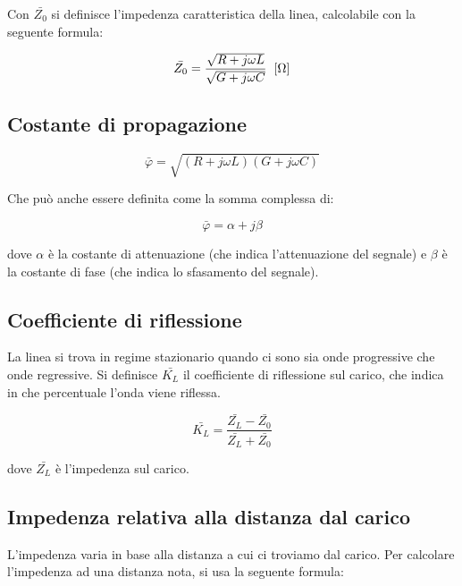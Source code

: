 \documentclass{article}
\begin{document}
    Con $\bar{Z_0}$ si definisce l'impedenza caratteristica della linea, calcolabile con la seguente formula:

    \begin{equation}
        \bar{Z_0} = \frac{\sqrt{R + j \omega L}}{\sqrt{G + j \omega C}} \hspace{0.2cm} [\Omega]
    \end{equation}

    \subsection{Costante di propagazione}

    \begin{equation}
        \bar{\varphi} = \sqrt{(R + j \omega L)(G + j \omega C)}
    \end{equation}

    Che può anche essere definita come la somma complessa di:

    \begin{equation}
        \bar{\varphi} = \alpha + j \beta
    \end{equation}

    dove $\alpha$ è la costante di attenuazione (che indica l'attenuazione del segnale) e $\beta$ è la 
    costante di fase (che indica lo sfasamento del segnale).

    \subsection{Coefficiente di riflessione}

    La linea si trova in regime stazionario quando ci sono sia onde progressive che onde regressive.
    Si definisce $\bar{K_L}$ il coefficiente di riflessione sul carico, che indica in che percentuale l'onda viene
    riflessa.

    \begin{equation}
        \bar{K_L} = \frac{
            \bar{Z_L} - \bar{Z_0}
        }{
            \bar{Z_L} + \bar{Z_0}
        }
    \end{equation}

    dove $\bar{Z_L}$ è l'impedenza sul carico.

    \subsection{Impedenza relativa alla distanza dal carico}

    L'impedenza varia in base alla distanza a cui ci troviamo dal carico. Per calcolare l'impedenza ad una distanza nota,
    si usa la seguente formula:
\end{document}
